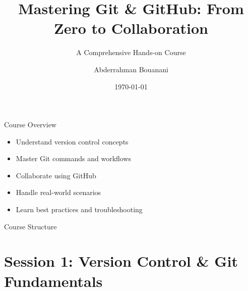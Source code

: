 \documentclass[aspectratio=169]{beamer}
\title[Git \& GitHub]{\textbf{Mastering Git \& GitHub: From Zero to Collaboration}}
\subtitle{A Comprehensive Hands-on Course}
\author{Abderrahman Bouanani}
\institute{ENSAA}
\date{\today}
\begin{document}
\begin{frame}
  \titlepage
\end{frame}

\begin{frame}{Course Overview}
  \begin{itemize}
    \item Understand version control concepts
    \item Master Git commands and workflows
    \item Collaborate using GitHub
    \item Handle real-world scenarios
    \item Learn best practices and troubleshooting
  \end{itemize}
\end{frame}

\begin{frame}{Course Structure}
  \tableofcontents
\end{frame}

\section{Session 1: Version Control \& Git Fundamentals}
\end{document}
